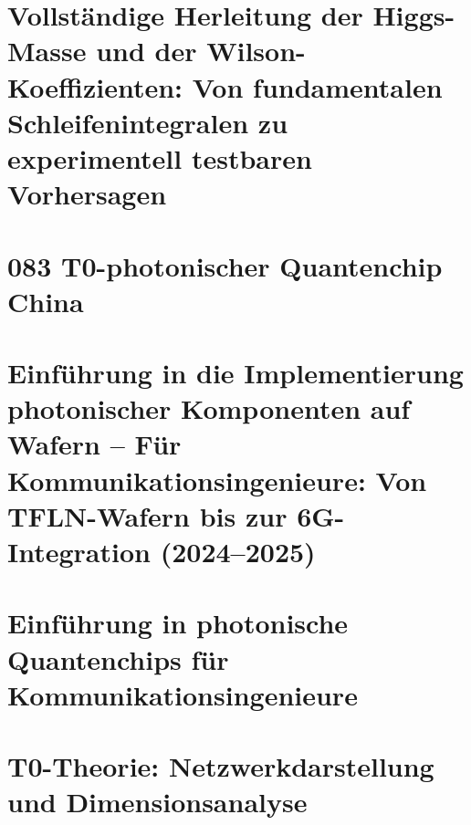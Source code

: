 \chapter{Vollständige Herleitung der Higgs-Masse und der Wilson-Koeffizienten: Von fundamentalen Schleifenintegralen zu experimentell testbaren Vorhersagen}

\chapter{083 T0-photonischer Quantenchip China}

\chapter{Einführung in die Implementierung photonischer Komponenten auf Wafern – Für Kommunikationsingenieure: Von TFLN-Wafern bis zur 6G-Integration (2024–2025)}

\chapter{Einführung in photonische Quantenchips für Kommunikationsingenieure}

\chapter{T0-Theorie: Netzwerkdarstellung und Dimensionsanalyse}




